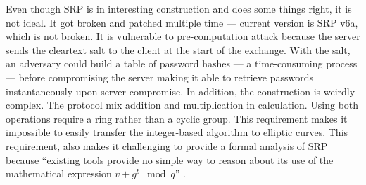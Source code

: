﻿\documentclass[../report.tex]{subfiles}
\begin{document}
Even though SRP is in interesting construction and does some things right, it is not ideal.
It got broken and patched multiple time --- current version is SRP v6a, which is not broken.
It is vulnerable to pre-computation attack because the server sends the cleartext salt to the client at the start of the exchange. With the salt, an adversary could build a table of password hashes --- a time-consuming process --- before compromising the server making it able to retrieve passwords instantaneously upon server compromise.
In addition, the construction is weirdly complex.
The protocol mix addition and multiplication in calculation. Using both operations require a ring rather than a cyclic group. This requirement makes it impossible to easily transfer the integer-based algorithm to elliptic curves. %
This requirement, also makes it challenging to provide a formal analysis of SRP because 
``existing tools provide no simple way to reason about its use of the mathematical expression $v+g^b \mod{q}$'' \cite{SRP_Formal_Analysis}. %

\paragraph{}
\end{document}
